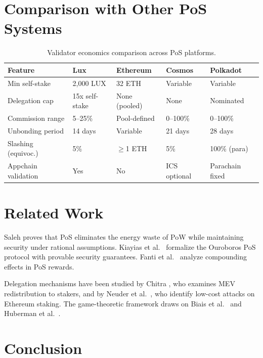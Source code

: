 \documentclass[11pt,a4paper]{article}
\begin{document}
\section{Comparison with Other PoS Systems}\label{sec:comparison}

\begin{table}[H]
\centering
\caption{Validator economics comparison across PoS platforms.}
\label{tab:comparison}
\begin{tabular}{p{2.8cm}p{2.2cm}p{2.2cm}p{2.2cm}p{2.2cm}}
\toprule
\textbf{Feature} & \textbf{Lux} & \textbf{Ethereum} & \textbf{Cosmos} & \textbf{Polkadot} \\
\midrule
Min self-stake & 2,000 LUX & 32 ETH & Variable & Variable \\
Delegation cap & 15x self-stake & None (pooled) & None & Nominated \\
Commission range & 5--25\% & Pool-defined & 0--100\% & 0--100\% \\
Unbonding period & 14 days & Variable & 21 days & 28 days \\
Slashing (equivoc.) & 5\% & $\geq$1 ETH & 5\% & 100\% (para) \\
Appchain validation & Yes & No & ICS optional & Parachain fixed \\
\bottomrule
\end{tabular}
\end{table}

\section{Related Work}\label{sec:related}

Saleh \cite{saleh2021blockchain} proves that PoS eliminates the energy waste of PoW while maintaining security under rational assumptions. Kiayias et al.\ \cite{kiayias2017ouroboros} formalize the Ouroboros PoS protocol with provable security guarantees. Fanti et al.\ \cite{fanti2019economics} analyze compounding effects in PoS rewards.

Delegation mechanisms have been studied by Chitra \cite{chitra2022improving}, who examines MEV redistribution to stakers, and by Neuder et al.\ \cite{neuder2021}, who identify low-cost attacks on Ethereum staking. The game-theoretic framework draws on Biais et al.\ \cite{biais2019blockchain} and Huberman et al.\ \cite{huberman2021monopoly}.

\section{Conclusion}\label{sec:conclusion}
\end{document}
